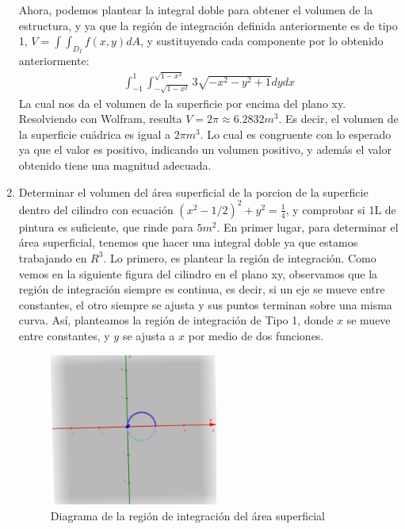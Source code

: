 \documentclass[12pt, letterpaper]{report}
\begin{document}
\begin{enumerate}
Ahora, podemos plantear la integral doble para obtener el volumen de la estructura, y ya que la región de integración definida 
anteriormente es de tipo 1, $V = \int \int_{D_I} f(x, y)dA$, y sustituyendo cada componente por lo obtenido anteriormente: 
\begin{align}
\int_{-1}^{1} \int_{-\sqrt{1-x^2}}^{\sqrt{1-x^2}} 3\sqrt{-x^2 -y^2 +1}dydx
\end{align} La cual nos da el volumen de la superficie por encima del plano xy. Resolviendo con Wolfram, resulta $V = 2\pi \approx 6.2832 m^3$. Es decir, 
el volumen de la superficie cuádrica es igual a $2\pi m^3$. Lo cual es congruente con lo esperado ya que el valor es positivo, indicando 
un volumen positivo, y además el valor obtenido tiene una magnitud adecuada. 

\item Determinar el volumen del área superficial de la porcion de la superficie dentro del cilindro con ecuación $(x^2 - 1/2)^2 + y^2 = \frac{1}{4}$, y comprobar si 
1L de pintura es suficiente, que rinde para $5 m^2$. 
En primer lugar, para determinar el área superficial, tenemos que hacer una integral doble ya que estamos trabajando en $R^3$. Lo primero, es plantear la región de integración. Como vemos en la siguiente figura del 
cilindro en el plano xy, observamos que la región de integración siempre es continua, es decir, si un eje se mueve entre constantes, el otro siempre se ajusta y sus puntos 
terminan sobre una misma curva. Así, planteamos la región de integración de Tipo 1, donde $x$ se mueve entre constantes, y $y$ se ajusta a $x$ por medio de dos funciones. \\ 
\begin{figure}[H]
    \centering
    \includegraphics[height = 5cm]{Diagrama 2.png}
    \caption{Diagrama de la región de integración del área superficial}
\end{figure}


\end{enumerate}
\end{document}
